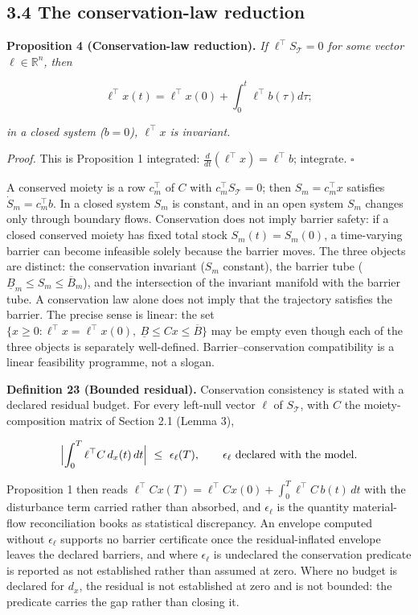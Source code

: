 \documentclass[11pt]{article}
\begin{document}
\subsection*{3.4 The conservation-law reduction}\label{34-the-conservation-law-reduction}

\textbf{Proposition 4 (Conservation-law reduction).} \emph{If \(\ell^\top S_{\mathcal{T}} = 0\) for some vector \(\ell \in \mathbb{R}^n\), then} 

$$\ell^\top x(t) = \ell^\top x(0) + \int_0^t \ell^\top b(\tau) d\tau;$$

 \emph{in a closed system (\(b = 0\)), \(\ell^\top x\) is invariant.}

\emph{Proof.} This is Proposition 1 integrated: \(\frac{d}{dt}(\ell^\top x) =\allowbreak{} \ell^\top b\); integrate. \(\square\)

A conserved moiety is a row \(c_m^\top\) of \(C\) with \(c_m^\top S_{\mathcal{T}} = 0\); then \(S_m = c_m^\top x\) satisfies \(\dot S_m = c_m^\top b\). In a closed system \(S_m\) is constant, and in an open system \(S_m\) changes only through boundary flows. Conservation does not imply barrier safety: if a closed conserved moiety has fixed total stock \(S_m(t) = S_m(0)\), a time-varying barrier can become infeasible solely because the barrier moves. The three objects are distinct: the conservation invariant (\(S_m\) constant), the barrier tube (\(\underline{B}_m \le S_m \le \overline{B}_m\)), and the intersection of the invariant manifold with the barrier tube. A conservation law alone does not imply that the trajectory satisfies the barrier. The precise sense is linear: the set \(\{x \ge 0 : \ell^\top x =\allowbreak{} \ell^\top x(0),\allowbreak{}\ \underline{B} \le Cx \le \overline{B}\}\) may be empty even though each of the three objects is separately well-defined. Barrier--conservation compatibility is a linear feasibility programme, not a slogan.

\textbf{Definition 23 (Bounded residual).} Conservation consistency is stated with a declared residual budget. For every left-null vector \(\ell\) of \(S_{\mathcal{T}}\), with \(C\) the moiety-composition matrix of Section 2.1 (Lemma 3), 

$$\Bigl|\int_0^T\ell^{\top}C\,d_x(t)\,dt\Bigr|\ \le\ \epsilon_\ell(T), \qquad \epsilon_\ell\ \text{declared with the model}.$$

 Proposition 1 then reads \(\ell^{\top}Cx(T)=\allowbreak{}\ell^{\top}Cx(0)+\allowbreak{}\int_0^T\ell^{\top}C\,\allowbreak{}b(t)\,\allowbreak{}dt\) with the disturbance term carried rather than absorbed, and \(\epsilon_\ell\) is the quantity material-flow reconciliation books as statistical discrepancy. An envelope computed without \(\epsilon_\ell\) supports no barrier certificate once the residual-inflated envelope leaves the declared barriers, and where \(\epsilon_\ell\) is undeclared the conservation predicate is reported as not established rather than assumed at zero. Where no budget is declared for \(d_x\), the residual is not established at zero and is not bounded: the predicate carries the gap rather than closing it.
\end{document}
